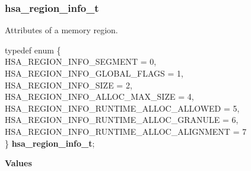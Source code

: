 \documentclass[final,oneside]{book}
\newcommand{\reftyp}[1]{#1}
\newcommand{\refenu}[1]{\reftyp{#1}}
\newenvironment{mylongtable}{\rowcolors{0}{lightgray}{lightgray}\longtable} {
\endlongtable}
\begin{document}
\subsubsection{hsa_\-region_\-info_\-t}
\vspace{-2.5mm}Attributes of a memory region.\begin{mylongtable}{@{}p{\textwidth}}
\rule{0pt}{3ex}typedef enum \{\\\hspace{1.7em}\hypertarget{group__memory_1ggad35755078ff15f645c6c25e7f7ef2707ab2701b5deebcf46596e8f070f6ef27b6}{\refenu{HSA_\-REGION_\-INFO_\-SEGMENT}} = 0,\\
\hspace{1.7em}\hypertarget{group__memory_1ggad35755078ff15f645c6c25e7f7ef2707a4c274d5a12fee091c48a0e3ae3c23052}{\refenu{HSA_\-REGION_\-INFO_\-GLOBAL_\-FLAGS}} = 1,\\
\hspace{1.7em}\hypertarget{group__memory_1ggad35755078ff15f645c6c25e7f7ef2707a09403f5c83497726504523694b3e86b6}{\refenu{HSA_\-REGION_\-INFO_\-SIZE}} = 2,\\
\hspace{1.7em}\hypertarget{group__memory_1ggad35755078ff15f645c6c25e7f7ef2707ab846101a22f46f61e0caf1d73cedd414}{\refenu{HSA_\-REGION_\-INFO_\-ALLOC_\-MAX_\-SIZE}} = 4,\\
\hspace{1.7em}\hypertarget{group__memory_1ggad35755078ff15f645c6c25e7f7ef2707afeba9dee45ad3e79940b7a4159ef5f67}{\refenu{HSA_\-REGION_\-INFO_\-RUNTIME_\-ALLOC_\-ALLOWED}} = 5,\\
\hspace{1.7em}\hypertarget{group__memory_1ggad35755078ff15f645c6c25e7f7ef2707a737c7f58926207f12f90289d9bd073b1}{\refenu{HSA_\-REGION_\-INFO_\-RUNTIME_\-ALLOC_\-GRANULE}} = 6,\\
\hspace{1.7em}\hypertarget{group__memory_1ggad35755078ff15f645c6c25e7f7ef2707ab30393820aee1093f455d122805174c5}{\refenu{HSA_\-REGION_\-INFO_\-RUNTIME_\-ALLOC_\-ALIGNMENT}} = 7\\
\} \hypertarget{group__memory_1gad35755078ff15f645c6c25e7f7ef2707}{\textbf{hsa_\-region_\-info_\-t}};\rule[-2ex]{0pt}{0pt}\end{mylongtable}\noindent\textbf{Values}\\[-7mm]
\end{document}
